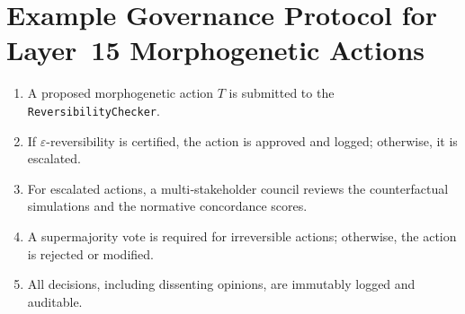 \section{Example Governance Protocol for Layer~15 Morphogenetic Actions}
\label{app:governance_example}
\begin{enumerate}
    \item A proposed morphogenetic action $T$ is submitted to the \texttt{ReversibilityChecker}.
    \item If $\varepsilon$-reversibility is certified, the action is approved and logged; otherwise, it is escalated.
    \item For escalated actions, a multi‑stakeholder council reviews the counterfactual simulations and the normative concordance scores.
    \item A supermajority vote is required for irreversible actions; otherwise, the action is rejected or modified.
    \item All decisions, including dissenting opinions, are immutably logged and auditable.
\end{enumerate}
